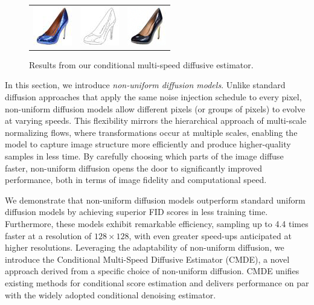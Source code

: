 \begin{figure}[h]
\begin{center}
\begin{tabular}{ccc}
        \includegraphics[width=.13\textwidth]{Outline/figures/non-uniform-diffusion-models/189_x.png} &   
        \includegraphics[width=.13\textwidth]{Outline/figures/non-uniform-diffusion-models/189_y.png} &
        \includegraphics[width=.13\textwidth]{Outline/figures/non-uniform-diffusion-models/189_2.png}  \\
    \end{tabular}
    \end{center}
    \caption{Results from our conditional multi-speed diffusive estimator.}
    \label{fig: teaser}
\end{figure}

In this section, we introduce \emph{non-uniform diffusion models}. Unlike standard diffusion approaches that apply the same noise injection schedule to every pixel, non-uniform diffusion models allow different pixels (or groups of pixels) to evolve at varying speeds. This flexibility mirrors the hierarchical approach of multi-scale normalizing flows, where transformations occur at multiple scales, enabling the model to capture image structure more efficiently and produce higher-quality samples in less time. By carefully choosing which parts of the image diffuse faster, non-uniform diffusion opens the door to significantly improved performance, both in terms of image fidelity and computational speed.

We demonstrate that non-uniform diffusion models outperform standard uniform diffusion models by achieving superior FID scores in less training time. Furthermore, these models exhibit remarkable efficiency, sampling up to 4.4 times faster at a resolution of $128 \times 128$, with even greater speed-ups anticipated at higher resolutions. Leveraging the adaptability of non-uniform diffusion, we introduce the Conditional Multi-Speed Diffusive Estimator (CMDE), a novel approach derived from a specific choice of non-uniform diffusion. CMDE unifies existing methods for conditional score estimation and delivers performance on par with the widely adopted conditional denoising estimator.

